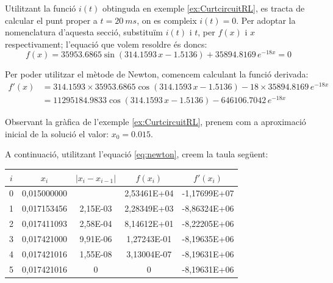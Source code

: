 \begin{exemple}\label{ex:SolFunNoLin}
	\addcontentsxms{\SolFunNoLin}	
    Utilitzant la funció $i(t)$ obtinguda en exemple \vref{ex:CurtcircuitRL}, es tracta de calcular el punt proper a $t = \qty{20}{ms}$, on es compleix $i(t)=0$. Per adoptar la nomenclatura d'aquesta secció, substituïm $i(t)$ i $t$, per $f(x)$ i $x$ respectivament; l'equació que volem resoldre és doncs:
    \[
        f(x) = \num{35953,6865}\sin(\num{314,1593}\,x-\num{1,5136}) + \num{35894,8169}\,e^{-18 x} = 0
    \]

    Per  poder utilitzar el mètode de Newton, comencem calculant la funció derivada:
    \begin{align*}
        f'(x) &= \num{314,1593}\times\num{35953,6865}\cos(\num{314,1593}\,x-\num{1,5136}) -18\times \num{35894,8169}\,e^{-18 x} \\
        {} &= \num{11295184,9833}\cos(\num{314,1593}\,x-\num{1,5136}) - \num{646106,7042}\,e^{-18 x}
    \end{align*}

    Observant la gràfica de l'exemple \ref{ex:CurtcircuitRL}, prenem com a  aproximació inicial de la solució el valor: $x_0 = \num{0,015}$.

    A continuació, utilitzant l'equació \eqref{eq:newton}, creem la taula següent:

\begin{center}
   \centering
   \begin{tabular}{S[table-format=1.0]S[table-format=2.9]S[table-format=2.2e+2]
   S[table-format=2.5e+2]S[table-format=+3.5e+2]}
    & {$x_i$}  & {$|x_i - x_{i-1}|$} & {$f(x_i)$} & {$f'(x_i)$} \\
    &	0,015000000 &	{}       & 2,53461E+04	& -1,17699E+07 \\
        1 &	0,017153456 &	2,15E-03 & 2,28349E+03	& -8,86324E+06 \\	
        2 &	0,017411093 &	2,58E-04 & 8,14612E+01	& -8,22205E+06 \\	
        3 &	0,017421000 &	9,91E-06 & 1,27243E-01	& -8,19635E+06 \\	
        4 &	0,017421016 &	1,55E-08 & 3,13004E-07	& -8,19631E+06 \\	
        5 &	0,017421016 &	0        & 0           	& -8,19631E+06 \\	
   \bottomrule[1pt]
   \end{tabular}
\end{center}


\end{exemple}
